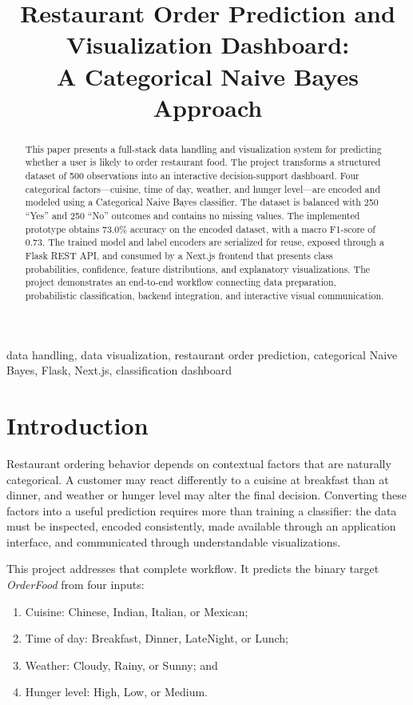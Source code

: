 \documentclass[conference]{IEEEtran}
\title{Restaurant Order Prediction and Visualization Dashboard:\\
A Categorical Naive Bayes Approach}
\author{
\IEEEauthorblockN{
Rachith Bharadwaj T N (24BDS062), Ullas G M (24BDS085),\\
M G Shree Harsha (24BDS037)}
\IEEEauthorblockA{
Department of Data Science and Artificial Intelligence\\
Indian Institute of Information Technology Dharwad, India}
}
\begin{document}
\maketitle

\begin{abstract}
This paper presents a full-stack data handling and visualization system for predicting whether a user is likely to order restaurant food. The project transforms a structured dataset of 500 observations into an interactive decision-support dashboard. Four categorical factors---cuisine, time of day, weather, and hunger level---are encoded and modeled using a Categorical Naive Bayes classifier. The dataset is balanced with 250 ``Yes'' and 250 ``No'' outcomes and contains no missing values. The implemented prototype obtains 73.0\% accuracy on the encoded dataset, with a macro F1-score of 0.73. The trained model and label encoders are serialized for reuse, exposed through a Flask REST API, and consumed by a Next.js frontend that presents class probabilities, confidence, feature distributions, and explanatory visualizations. The project demonstrates an end-to-end workflow connecting data preparation, probabilistic classification, backend integration, and interactive visual communication.
\end{abstract}

\begin{IEEEkeywords}
data handling, data visualization, restaurant order prediction, categorical Naive Bayes, Flask, Next.js, classification dashboard
\end{IEEEkeywords}

\section{Introduction}

Restaurant ordering behavior depends on contextual factors that are naturally categorical. A customer may react differently to a cuisine at breakfast than at dinner, and weather or hunger level may alter the final decision. Converting these factors into a useful prediction requires more than training a classifier: the data must be inspected, encoded consistently, made available through an application interface, and communicated through understandable visualizations.

This project addresses that complete workflow. It predicts the binary target \textit{OrderFood} from four inputs:
\begin{enumerate}
    \item Cuisine: Chinese, Indian, Italian, or Mexican;
    \item Time of day: Breakfast, Dinner, LateNight, or Lunch;
    \item Weather: Cloudy, Rainy, or Sunny; and
    \item Hunger level: High, Low, or Medium.
\end{enumerate}
\end{document}

